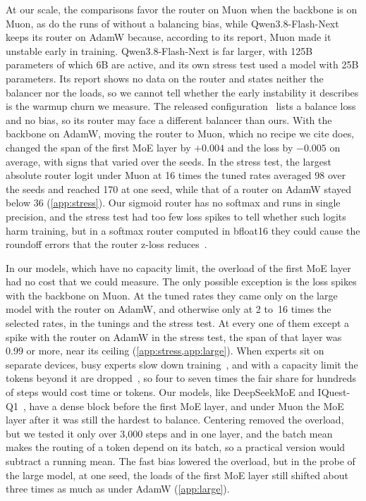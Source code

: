 \documentclass[11pt, a4paper]{article}
\begin{document}
At our scale, the comparisons favor the router on Muon when the backbone is on Muon, as do the runs of \citet{lau2026symmetry} without a balancing bias, while Qwen3.8-Flash-Next keeps its router on AdamW because, according to its report, Muon made it unstable early in training. Qwen3.8-Flash-Next is far larger, with 125B parameters of which 6B are active, and its own stress test used a model with 25B parameters. Its report shows no data on the router and states neither the balancer nor the loads, so we cannot tell whether the early instability it describes is the warmup churn we measure. The released configuration~\citep{qwen2026flashnextcard} lists a balance loss and no bias, so its router may face a different balancer than ours. With the backbone on AdamW, moving the router to Muon, which no recipe we cite does, changed the span of the first MoE layer by $+0.004$ and the loss by $-0.005$ on average, with signs that varied over the seeds. In the stress test, the largest absolute router logit under Muon at 16 times the tuned rates averaged 98 over the seeds and reached 170 at one seed, while that of a router on AdamW stayed below 36 (\cref{app:stress}). Our sigmoid router has no softmax and runs in single precision, and the stress test had too few loss spikes to tell whether such logits harm training, but in a softmax router computed in bfloat16 they could cause the roundoff errors that the router z-loss reduces~\citep{zoph2022stmoe}.

In our models, which have no capacity limit, the overload of the first MoE layer had no cost that we could measure. The only possible exception is the loss spikes with the backbone on Muon. At the tuned rates they came only on the large model with the router on AdamW, and otherwise only at 2 to~16 times the selected rates, in the tunings and the stress test. At every one of them except a spike with the router on AdamW in the stress test, the span of that layer was 0.99 or more, near its ceiling (\cref{app:stress,app:large}). When experts sit on separate devices, busy experts slow down training~\citep{lepikhin2021gshard}, and with a capacity limit the tokens beyond it are dropped~\citep{fedus2022switch}, so four to seven times the fair share for hundreds of steps would cost time or tokens. Our models, like DeepSeekMoE and IQuest-Q1~\citep{dai2024deepseekmoe, yang2026iquest}, have a dense block before the first MoE layer, and under Muon the MoE layer after it was still the hardest to balance. Centering removed the overload, but we tested it only over 3,000 steps and in one layer, and the batch mean makes the routing of a token depend on its batch, so a practical version would subtract a running mean. The fast bias lowered the overload, but in the probe of the large model, at one seed, the loads of the first MoE layer still shifted about three times as much as under AdamW (\cref{app:large}).
\end{document}
